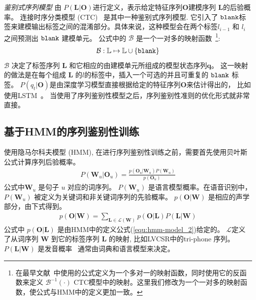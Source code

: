{\em 鉴别式序列模型} 由 $P(\mathbf{L}|\mathbf{O})$进行定义，表示给定特征序列$\mathbf{O}$建模序列 $\mathbf{L}$的后验概率。 
连接时序分类模型 (CTC)~\cite{graves2006connectionist} 是其中一种鉴别式序列模型. 它引入了 $\tt blank$标签来建模输出标签之间的混淆部分。具体来说，这种模型会在两个标签$l_{i-1}$ 和 $l_{i}$之间预测出 $ \tt blank$ 建模单元。
公式中的 $\mathcal{B}$ 是一个一对多的映射函数~\footnote{在最早文献~\cite{graves2006connectionist}中使用的公式定义为一个多对一的映射函数，同时使用它的反函数来定义 $\mathcal{B}^{-1}(\cdot)$ CTC模型中的映射。这里我们修改为一个一对多的映射函数，使公式与HMM中的定义更加一致。}:
\begin{equation}
\label{equ:ctc-b_2}
\begin{split}
\mathcal{B}:\mathbb{L}   \mapsto  \mathbb{L} \cup \{\tt blank\}
\end{split}
\end{equation}
$\mathcal{B}$ 决定了标签序列 $\mathbf{L}$ 和它相应的由建模单元所组成的模型状态序列$\mathbf{q}$。 这一映射的做法是在每个组成 $\mathbf{L}$ 的$l$的标签中，插入一个可选的并且可重复的 $ \tt blank$ 标签。 $P(q_t|\mathbf{O})$是由深度学习模型直接根据给定的特征序列$\mathbf{O}$来估计得出的， 比如使用LSTM~\cite{hochreiter1997long}。 
当使用了序列鉴别性模型之后，序列鉴别性准则的优化形式就非常直接。

%

\subsection{基于HMM的序列鉴别性训练}
\label{Sec:sgm-sdt-intro}

使用隐马尔科夫模型 (HMM), 在进行序列鉴别性训练之前，需要首先使用贝叶斯公式计算序列后验概率。
\begin{equation}
\label{equ:map-dec}
\begin{split}
P(\mathbf{W}_u|\mathbf{O}_u)=\frac {p(\mathbf{O}_u|\mathbf{W}_u)P(\mathbf{W}_u)}{p(\mathbf{O}_u)}  
\end{split}
\end{equation}
公式中$\mathbf{W}_u$ 是句子 $u$ 对应的词序列。 $P(\mathbf{W}_u)$ 是语言模型概率。在语音识别中，$P(\mathbf{W}_u)$ 被定义为关键词和非关键词序列的先验概率。
$p(\mathbf{O}|\mathbf{W})$ 是相应的声学部分，由下式得到。
\begin{equation}
\label{equ:lexicon}
\begin{split}
p(\mathbf{O}|\mathbf{W})=\sum_{\mathbf{L}\in\mathcal{L}(\mathbf{W})} p(\mathbf{O}|\mathbf{L})P(\mathbf{L}|\mathbf{W})
\end{split}
\end{equation}
公式中 $p(\mathbf{O}|\mathbf{L})$ 是由HMM中的定义公式(\ref{equ:hmm-model_2})给定的。 $\mathcal{L}$定义了从词序列 $\mathbf{W}$ 到它的标签序列 $\mathbf{L}$ 的映射, 比如LVCSR中的tri-phone 序列。 $P(\mathbf{L}|\mathbf{W})$ 是发音概率~\cite{chen2015pronunciation} 通常由词典和语言模型来决定。

